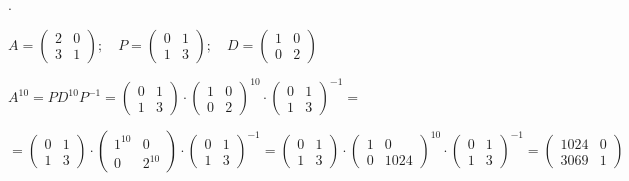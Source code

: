 \begin{proofw}\renewcommand{\qedsymbol}{$\diamond$}.

$A=\left( \begin{matrix} 2&0\\3&1 \end{matrix} \right); \quad P=\left( \begin{matrix} 0&1\\1&3 \end{matrix} \right) ; \quad D=\left( \begin{matrix} 1&0\\0&2 \end{matrix} \right)$

$A^{10}=PD^{10}P^{-1}=\left( \begin{matrix} 0&1\\1&3 \end{matrix} \right) \cdot \left( \begin{matrix} 1&0\\0&2 \end{matrix} \right)^{10}\cdot \left( \begin{matrix} 0&1\\1&3 \end{matrix} \right)^{-1}=$

\noindent $=\left( \begin{matrix} 0&1\\1&3 \end{matrix} \right) \cdot \left( \begin{matrix} 1^{10}&0\\0&2^{10} \end{matrix} \right)\cdot \left( \begin{matrix} 0&1\\1&3 \end{matrix} \right)^{-1}=
\left( \begin{matrix} 0&1\\1&3 \end{matrix} \right) \cdot \left( \begin{matrix} 1&0\\0&1024 \end{matrix} \right)^{10}\cdot \left( \begin{matrix} 0&1\\1&3 \end{matrix} \right)^{-1}=\left( \begin{matrix} 1024&0\\3069&1 \end{matrix} \right)$
	
\end{proofw}


